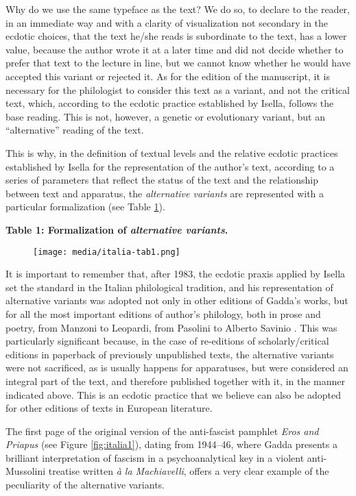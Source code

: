 \documentclass{article}
\begin{document}
Why do we use the same typeface as the text? We do so, to declare to the
reader, in an immediate way and with a clarity of visualization not
secondary in the ecdotic choices, that the text he/she reads is
subordinate to the text, has a lower value, because the author wrote it
at a later time and did not decide whether to prefer that text to the
lecture in line, but we cannot know whether he would have accepted this
variant or rejected it. As for the edition of the manuscript, it is
necessary for the philologist to consider this text as a variant, and
not the critical text, which, according to the ecdotic practice
established by Isella, follows the base reading. This is not, however, a
genetic or evolutionary variant, but an ``alternative'' reading of the
text.

This is why, in the definition of textual levels and the relative
ecdotic practices established by Isella for the representation of the
author's text, according to a series of parameters that reflect the
status of the text and the relationship between text and apparatus, the
\emph{alternative variants} are represented with a particular
formalization (see Table \ref{tab:italia:ecdotic}).

\textbf{Table 1: Formalization of \textit{alternative variants}.}

\begin{figure}
    \centering
    \texttt{[image: media/italia-tab1.png]}
    \label{tab:italia:ecdotic}
\end{figure}

It is important to remember that, after 1983, the ecdotic praxis applied
by Isella set the standard in the Italian philological tradition, and
his representation of alternative variants was adopted not only in other
editions of Gadda's works, but for all the most important editions of
author's philology, both in prose and poetry, from Manzoni to Leopardi,
from Pasolini to Alberto Savinio \parencite[57--59]{italia_what_2021}. This was
particularly significant because, in the case of re-editions of
scholarly/critical editions in paperback of previously unpublished
texts, the alternative variants were not sacrificed, as is usually
happens for apparatuses, but were considered an integral part of the
text, and therefore published together with it, in the manner indicated
above. This is an ecdotic practice that we believe can also be adopted for other
editions of texts in European literature.

The first page of the original version of the anti-fascist
pamphlet \emph{Eros and Priapus} (see Figure \ref{fig:italia1}), dating from 1944--46, where Gadda presents a
brilliant interpretation of fascism in a psychoanalytical key in a
violent anti-Mussolini treatise written \emph{à la Machiavelli}, offers a
very clear example of the peculiarity of the alternative variants.
\end{document}
